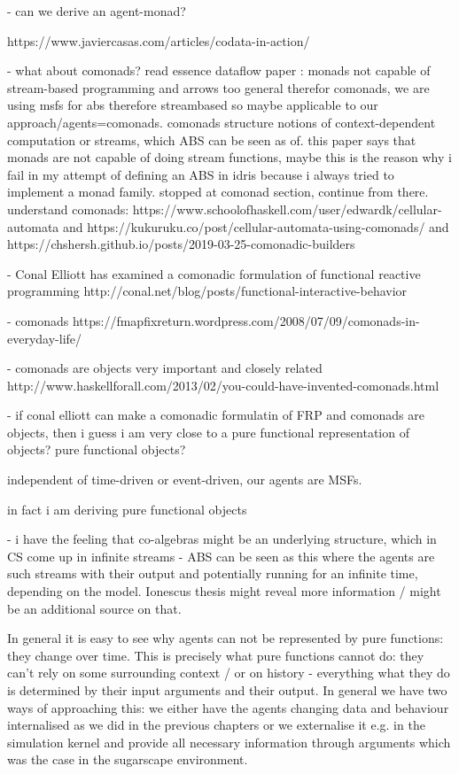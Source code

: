 - can we derive an agent-monad?

https://www.javiercasas.com/articles/codata-in-action/

- what about comonads? read essence dataflow paper \cite{uustalu_essence_2006}: monads not capable of stream-based programming and arrows too general therefor comonads, we are using msfs for abs therefore streambased so maybe applicable to our approach/agents=comonads. comonads structure notions of context-dependent computation or streams, which ABS can be seen as of. this paper says that monads are not capable of doing stream functions, maybe this is the reason why i fail in my attempt of defining an ABS in idris because i always tried to implement a monad family. stopped at comonad section, continue from there. understand comonads: https://www.schoolofhaskell.com/user/edwardk/cellular-automata and https://kukuruku.co/post/cellular-automata-using-comonads/ and https://chshersh.github.io/posts/2019-03-25-comonadic-builders

- Conal Elliott has examined a comonadic formulation of functional reactive programming http://conal.net/blog/posts/functional-interactive-behavior

- comonads https://fmapfixreturn.wordpress.com/2008/07/09/comonads-in-everyday-life/

- comonads are objects very important and closely related http://www.haskellforall.com/2013/02/you-could-have-invented-comonads.html

- if conal elliott can make a comonadic formulatin of FRP and comonads are objects, then i guess i am very close to a pure functional representation of objects? pure functional objects?


independent of time-driven or event-driven, our agents are MSFs.

in fact i am deriving pure functional objects

- i have the feeling that co-algebras might be an underlying structure, which in CS come up in infinite streams - ABS can be seen as this where the agents are such streams with their output and potentially running for an infinite time, depending on the model. Ionescus thesis might reveal more information / might be an additional source on that.

In general it is easy to see why agents can not be represented by pure functions: they change over time. This is precisely what pure functions cannot do: they can't rely on some surrounding context / or on history - everything what they do is determined by their input arguments and their output. In general we have two ways of approaching this: we either have the agents changing data and behaviour internalised as we did in the previous chapters or we externalise it e.g. in the simulation kernel and provide all necessary information through arguments which was the case in the sugarscape environment.


